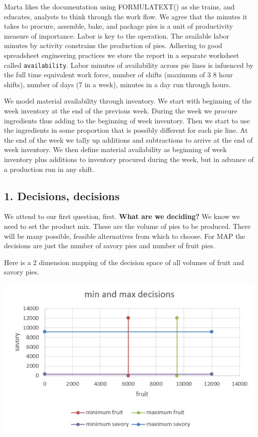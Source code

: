 \documentclass[
]{book}
\begin{document}
Marta likes the documentation using FORMULATEXT() as she trains, and educates, analysts to think through the work flow. We agree that the minutes it takes to procure, assemble, bake, and package pies is a unit of productivity measure of importance. Labor is key to the operation. The available labor minutes by activity constrains the production of pies. Adhering to good spreadsheet engineering practices we store the report in a separate worksheet called \texttt{availability}. Labor minutes of availability across pie lines is infuenced by the full time equivalent work force, number of shifts (maximum of 3 8 hour shifts), number of days (7 in a week), minutes in a day run through hours.

We model material availability through inventory. We start with beginning of the week inventory at the end of the previous week. During the week we procure ingredients thus adding to the beginning of week inventory. Then we start to use the ingredients in some proportion that is possibly different for each pie line. At the end of the week we tally up additions and subtractions to arrive at the end of week inventory. We then define material availability as beginning of week inventory plus additions to inventory procured during the week, but in advance of a production run in any shift.

\hypertarget{decisions-decisions}{%
\subsection{1. Decisions, decisions}\label{decisions-decisions}}

We attend to our first question, first. \textbf{What are we deciding?} We know we need to set the product mix. These are the volume of pies to be produced. There will be many possible, feasible alternatives from which to choose. For MAP the decisions are just the number of savory pies and number of fruit pies.

Here is a 2 dimension mapping of the decision space of all volumes of fruit and savory pies.

\includegraphics{images/03/pie-2-product-decisions.jpg}
\end{document}
